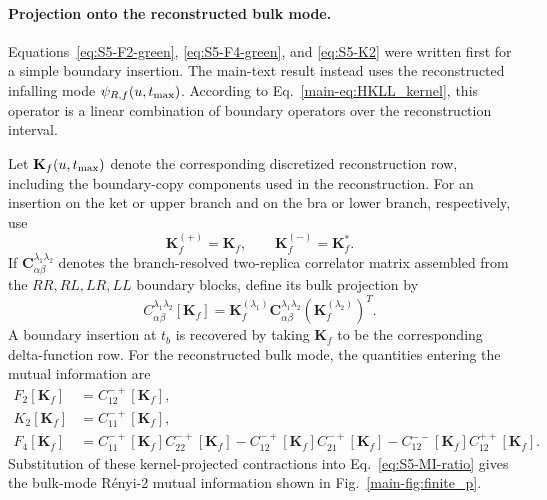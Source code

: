 \documentclass[11pt,a4paper]{article}
\begin{document}
\paragraph*{Projection onto the reconstructed bulk mode.}

Equations~\eqref{eq:S5-F2-green}, \eqref{eq:S5-F4-green}, and
\eqref{eq:S5-K2} were written first for a simple boundary insertion. The
main-text result instead uses the reconstructed infalling mode
\(\psi_{R,f}(u,t_{\rm max})\). According to
Eq.~\eqref{main-eq:HKLL_kernel}, this operator is a linear combination of
boundary operators over the reconstruction interval.

Let \(\mathbf K_f(u,t_{\rm max})\) denote the corresponding discretized
reconstruction row, including the boundary-copy components used in the
reconstruction. For an insertion on the ket or upper branch and on the bra
or lower branch, respectively, use
\begin{equation}
  \mathbf K_f^{(+)}
  =
  \mathbf K_f,
  \qquad
  \mathbf K_f^{(-)}
  =
  \mathbf K_f^*.
\label{eq:S5-kernel-branch-rule}
\end{equation}
If
\(\mathbf C_{\alpha\beta}^{\lambda_1\lambda_2}\)
denotes the branch-resolved two-replica correlator matrix assembled from the
\(RR,RL,LR,LL\) boundary blocks, define its bulk projection by
\begin{equation}
  C_{\alpha\beta}^{\lambda_1\lambda_2}
  [\mathbf K_f]
  =
  \mathbf K_f^{(\lambda_1)}
  \mathbf C_{\alpha\beta}^{\lambda_1\lambda_2}
  \left(
  \mathbf K_f^{(\lambda_2)}
  \right)^T .
\label{eq:S5-kernel-projection}
\end{equation}
A boundary insertion at \(t_b\) is recovered by taking
\(\mathbf K_f\) to be the corresponding delta-function row. For the
reconstructed bulk mode, the quantities entering the mutual information are
\begin{equation}
\begin{aligned}
  F_2[\mathbf K_f]
  &=
  C_{12}^{-+}[\mathbf K_f],
  \\
  K_2[\mathbf K_f]
  &=
  C_{11}^{-+}[\mathbf K_f],
  \\
  F_4[\mathbf K_f]
  &=
  C_{11}^{-+}[\mathbf K_f]
  C_{22}^{-+}[\mathbf K_f]
  -
  C_{12}^{-+}[\mathbf K_f]
  C_{21}^{-+}[\mathbf K_f]
  -
  C_{12}^{--}[\mathbf K_f]
  C_{12}^{++}[\mathbf K_f].
\end{aligned}
\label{eq:S5-bulk-contractions}
\end{equation}
Substitution of these kernel-projected contractions into
Eq.~\eqref{eq:S5-MI-ratio} gives the bulk-mode R\'enyi-2 mutual information
shown in Fig.~\ref{main-fig:finite_p}.
\end{document}
